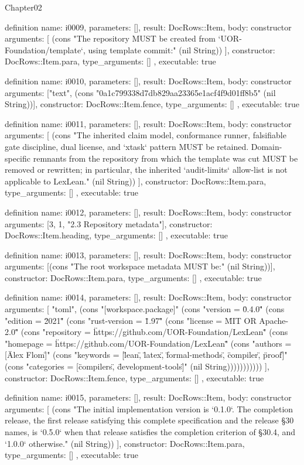 \begin{lexlean}{Chapter02}
\begin{semanticmodule}
definition{
  name: i0009,
  parameters: [],
  result: DocRows::Item,
  body: constructor{
    arguments: [
      (cons "The repository MUST be created from `UOR-Foundation/template`, using template commit:" (nil String))
    ],
    constructor: DocRows::Item.para,
    type_arguments: []
  },
  executable: true
}

definition{
  name: i0010,
  parameters: [],
  result: DocRows::Item,
  body: constructor{
    arguments: ["text", (cons "0a1c799338d7db829aa23365e1acf4f9d01ff8b5" (nil String))],
    constructor: DocRows::Item.fence,
    type_arguments: []
  },
  executable: true
}

definition{
  name: i0011,
  parameters: [],
  result: DocRows::Item,
  body: constructor{
    arguments: [
      (cons "The inherited claim model, conformance runner, falsifiable gate discipline, dual license, and `xtask` pattern MUST be retained. Domain-specific remnants from the repository from which the template was cut MUST be removed or rewritten; in particular, the inherited `audit-limits` allow-list is not applicable to LexLean." (nil String))
    ],
    constructor: DocRows::Item.para,
    type_arguments: []
  },
  executable: true
}

definition{
  name: i0012,
  parameters: [],
  result: DocRows::Item,
  body: constructor{
    arguments: [3, 1, "2.3 Repository metadata"],
    constructor: DocRows::Item.heading,
    type_arguments: []
  },
  executable: true
}

definition{
  name: i0013,
  parameters: [],
  result: DocRows::Item,
  body: constructor{
    arguments: [(cons "The root workspace metadata MUST be:" (nil String))],
    constructor: DocRows::Item.para,
    type_arguments: []
  },
  executable: true
}

definition{
  name: i0014,
  parameters: [],
  result: DocRows::Item,
  body: constructor{
    arguments: [
      "toml",
      (cons "[workspace.package]" (cons "version = \"0.4.0\"" (cons "edition = \"2021\"" (cons "rust-version = \"1.97\"" (cons "license = \"MIT OR Apache-2.0\"" (cons "repository = \"https://github.com/UOR-Foundation/LexLean\"" (cons "homepage = \"https://github.com/UOR-Foundation/LexLean\"" (cons "authors = [\"Alex Flom\"]" (cons "keywords = [\"lean\", \"latex\", \"formal-methods\", \"compiler\", \"proof\"]" (cons "categories = [\"compilers\", \"development-tools\"]" (nil String)))))))))))
    ],
    constructor: DocRows::Item.fence,
    type_arguments: []
  },
  executable: true
}

definition{
  name: i0015,
  parameters: [],
  result: DocRows::Item,
  body: constructor{
    arguments: [
      (cons "The initial implementation version is `0.1.0`. The completion release, the first release satisfying this complete specification and the release §30 names, is `0.5.0` when that release satisfies the completion criterion of §30.4, and `1.0.0` otherwise." (nil String))
    ],
    constructor: DocRows::Item.para,
    type_arguments: []
  },
  executable: true
}


\end{semanticmodule}
\end{lexlean}
